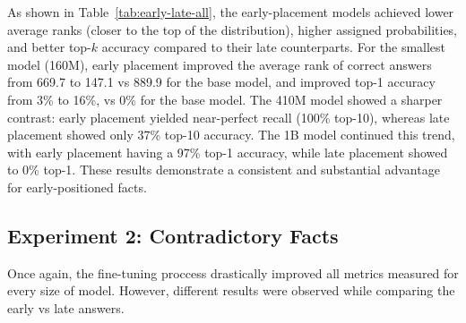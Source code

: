 \documentclass[11pt]{article}
\begin{document}
    As shown in Table~\ref{tab:early-late-all}, the early-placement models achieved lower average ranks (closer to the top of the distribution), higher assigned probabilities, and better top-$k$ accuracy compared to their late counterparts. For the smallest model (160M), early placement improved the average rank of correct answers from 669.7 to 147.1 vs 889.9 for the base model, and improved top-1 accuracy from 3\% to 16\%, vs 0\% for the base model. The 410M model showed a sharper contrast: early placement yielded near-perfect recall (100\% top-10), whereas late placement showed only 37\% top-10 accuracy. The 1B model continued this trend, with early placement having a 97\% top-1 accuracy, while late placement showed to 0\% top-1. These results demonstrate a consistent and substantial advantage for early-positioned facts.

    \subsection{Experiment 2: Contradictory Facts}

    Once again, the fine-tuning proccess drastically improved all metrics measured for every size of model. However, different results were observed while comparing the early vs late answers.
\end{document}

